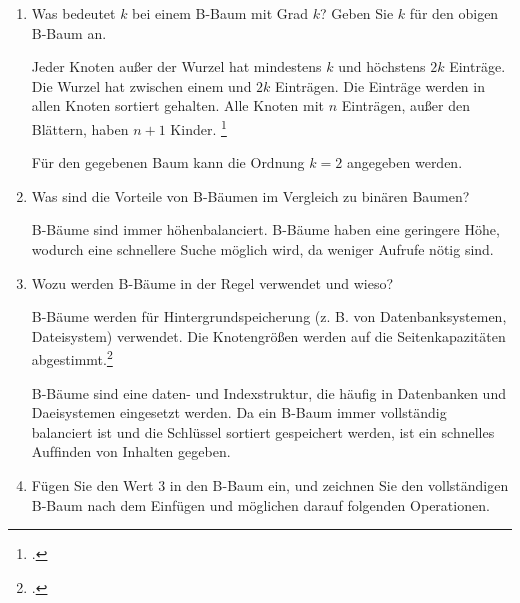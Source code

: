 \documentclass{bschlangaul-aufgabe}
\begin{document}
\begin{enumerate}


\item Was bedeutet $k$ bei einem B-Baum mit Grad $k$? Geben Sie $k$ für
den obigen B-Baum an.

\begin{bAntwort}
Jeder Knoten außer der Wurzel hat mindestens $k$ und höchstens $2k$
Einträge. Die Wurzel hat zwischen einem und $2k$ Einträgen. Die Einträge
werden in allen Knoten sortiert gehalten. Alle Knoten mit $n$ Einträgen,
außer den Blättern, haben $n + 1$ Kinder.
\footcite[Seite 225]{kemper}

Für den gegebenen Baum kann die Ordnung $k = 2$ angegeben werden.
\end{bAntwort}


\item Was sind die Vorteile von B-Bäumen im Vergleich zu binären Baumen?

\begin{bAntwort}
B-Bäume sind immer höhenbalanciert. B-Bäume haben eine geringere Höhe,
wodurch eine schnellere Suche möglich wird, da weniger Aufrufe nötig
sind.
\end{bAntwort}


\item Wozu werden B-Bäume in der Regel verwendet und wieso?

\begin{bAntwort}
B-Bäume werden für Hintergrundspeicherung (z. B. von Datenbanksystemen,
Dateisystem) verwendet. Die Knotengrößen werden auf die
Seitenkapazitäten abgestimmt.\footcite[Seite 223]{kemper}

B-Bäume sind eine daten- und Indexstruktur, die häuﬁg in Datenbanken und
Daeisystemen eingesetzt werden. Da ein B-Baum immer vollständig
balanciert ist und die Schlüssel sortiert gespeichert werden, ist ein
schnelles Aufﬁnden von Inhalten gegeben.
\end{bAntwort}


\item Fügen Sie den Wert $3$ in den B-Baum ein, und zeichnen Sie den
vollständigen B-Baum nach dem Einfügen und möglichen darauf folgenden
Operationen.


\end{enumerate}
\end{document}

